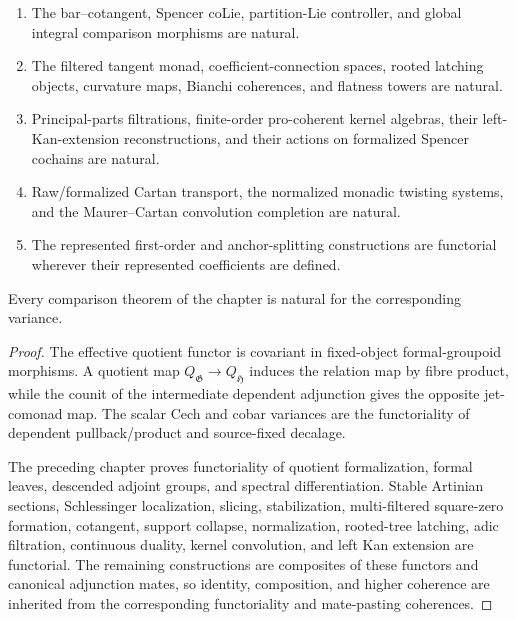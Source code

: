 \begin{theorem}
\begin{enumerate}
    \item The bar--cotangent, Spencer coLie, partition-Lie controller, and
    global integral comparison morphisms are natural.

    \item The filtered tangent monad, coefficient-connection spaces, rooted
    latching objects, curvature maps, Bianchi coherences, and flatness towers
    are natural.

    \item Principal-parts filtrations, finite-order pro-coherent kernel
    algebras, their left-Kan-extension reconstructions, and their actions on
    formalized Spencer cochains are natural.

    \item Raw/formalized Cartan transport, the normalized monadic twisting
    systems, and the Maurer--Cartan convolution completion are natural.

    \item The represented first-order and anchor-splitting constructions are
    functorial wherever their represented coefficients are defined.
\end{enumerate}
Every comparison theorem of the chapter is natural for the corresponding
variance.
\end{theorem}

\begin{proof}
The effective quotient functor is covariant in fixed-object formal-groupoid
morphisms.  A quotient map
$Q_{\mathfrak G}\to Q_{\mathfrak H}$ induces the relation map by fibre
product, while the counit of the intermediate dependent adjunction gives the
opposite jet-comonad map.  The scalar Cech and cobar variances are the
functoriality of dependent pullback/product and source-fixed decalage.

The preceding chapter proves functoriality of quotient formalization, formal
leaves, descended adjoint groups, and spectral differentiation.  Stable
Artinian sections, Schlessinger localization, slicing, stabilization,
multi-filtered square-zero formation, cotangent, support collapse,
normalization, rooted-tree latching, adic filtration, continuous duality,
kernel convolution, and left Kan extension are functorial.  The remaining
constructions are composites of these functors and canonical adjunction
mates, so identity, composition, and higher coherence are inherited from the
corresponding functoriality and mate-pasting coherences.
\end{proof}

